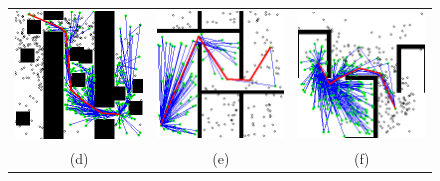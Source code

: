 \documentclass{article}
\begin{document}
\begin{figure}
{\begin{tabular}{ccc}
			\includegraphics[scale=0.45]{imgs/bit_paths/one_per_map/bitstar_result_21852.png} & \includegraphics[scale=0.45]{imgs/bit_paths/one_per_map/bitstar_result_22351.png} & \includegraphics[scale=0.45]{imgs/bit_paths/one_per_map/bitstar_result_22704.png}\\
			(d) & (e) & (f)\\[6pt]

\end{tabular}}
\end{figure}
\end{document}
